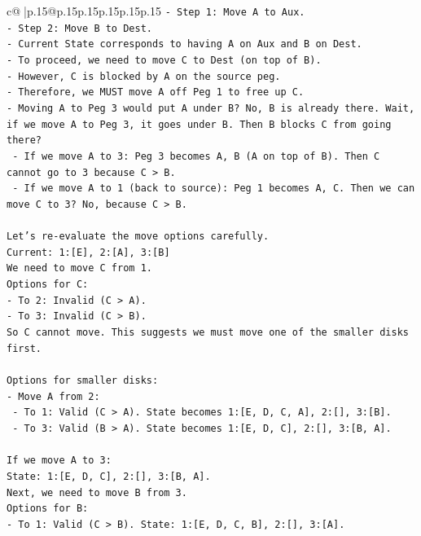 \documentclass{article}
\begin{document}
{\begin{supertabular}{c@{$\;$}|p{.15\linewidth}@{}p{.15\linewidth}p{.15\linewidth}p{.15\linewidth}p{.15\linewidth}p{.15\linewidth}}
{{{\texttt{{-} Step 1: Move A to Aux.} \\
\texttt{{-} Step 2: Move B to Dest.} \\
\texttt{{-} Current State corresponds to having A on Aux and B on Dest.} \\
\texttt{{-} To proceed, we need to move C to Dest (on top of B).} \\
\texttt{{-} However, C is blocked by A on the source peg.} \\
\texttt{{-} Therefore, we MUST move A off Peg 1 to free up C.} \\
\texttt{{-} Moving A to Peg 3 would put A under B? No, B is already there. Wait, if we move A to Peg 3, it goes under B. Then B blocks C from going there?} \\
\texttt{  {-} If we move A to 3: Peg 3 becomes A, B (A on top of B). Then C cannot go to 3 because C > B.} \\
\texttt{  {-} If we move A to 1 (back to source): Peg 1 becomes A, C. Then we can move C to 3? No, because C > B.} \\
\\ 
\texttt{Let's re{-}evaluate the move options carefully.} \\
\texttt{Current: 1:{[}E{]}, 2:{[}A{]}, 3:{[}B{]}} \\
\texttt{We need to move C from 1.} \\
\texttt{Options for C:} \\
\texttt{{-} To 2: Invalid (C > A).} \\
\texttt{{-} To 3: Invalid (C > B).} \\
\texttt{So C cannot move. This suggests we must move one of the smaller disks first.} \\
\\ 
\texttt{Options for smaller disks:} \\
\texttt{{-} Move A from 2:} \\
\texttt{  {-} To 1: Valid (C > A). State becomes 1:{[}E, D, C, A{]}, 2:{[}{]}, 3:{[}B{]}.} \\
\texttt{  {-} To 3: Valid (B > A). State becomes 1:{[}E, D, C{]}, 2:{[}{]}, 3:{[}B, A{]}.} \\
\\ 
\texttt{If we move A to 3:} \\
\texttt{State: 1:{[}E, D, C{]}, 2:{[}{]}, 3:{[}B, A{]}.} \\
\texttt{Next, we need to move B from 3.} \\
\texttt{Options for B:} \\
\texttt{{-} To 1: Valid (C > B). State: 1:{[}E, D, C, B{]}, 2:{[}{]}, 3:{[}A{]}.} \\
}}}
\end{supertabular}}
\end{document}
